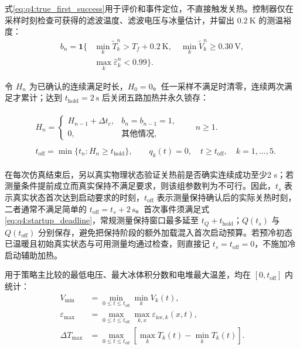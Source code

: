 \documentclass[bwprint]{gmcmthesis}
\numberwithin{equation}{section}
\numberwithin{figure}{section}
\begin{document}
式\eqref{eq:q4:true_first_success}用于评价和事件定位，不直接触发关热。控制器仅在采样时刻检查可获得的滤波温度、滤波电压与冰量估计，并留出 $0.2\ \mathrm K$ 的测温裕度：
\begin{equation}
\begin{aligned}
b_n=\boldsymbol 1\big\{&
\min_k\widetilde T_k^n>T_f+0.2\ \mathrm K,
\quad\min_k\widetilde V_k^n\geq0.30\ \mathrm V,
\\
&\max_k\widehat\varepsilon_k^n<0.99\big\}.
\end{aligned}
\label{eq:q4:sensor_condition}
\end{equation}

令 $H_n$ 为已确认的连续满足时长，$H_0=0$。任一采样不满足时清零，连续两次满足才累计；达到 $t_{\mathrm{hold}}=2\ \mathrm s$ 后关闭五路加热并永久锁存：

\begin{align}
&
\begin{gathered}
H_n=\begin{cases}
H_{n-1}+\Delta t_c, & b_n=b_{n-1}=1,\\
0, & \text{其他情况},
\end{cases}
\qquad n\geq1.
\end{gathered}
\label{eq:q4:hold_counter}\\
&
\begin{gathered}
t_{\mathrm{off}}=\min\{t_n:H_n\geq t_{\mathrm{hold}}\},
\qquad q_k(t)=0,\quad t\geq t_{\mathrm{off}},\quad k=1,\ldots,5.
\end{gathered}
\label{eq:q4:shutdown_latch}
\end{align}

在每次仿真结束后，另以真实物理状态验证关热前是否确实连续成功至少2 s；若测量条件提前成立而真实保持不满足要求，则该组参数判为不可行。因此，$t_s$ 表示真实状态首次达到启动要求的时刻，$t_{\mathrm{off}}$ 表示测量保持确认后的实际关热时刻，二者通常不满足简单的 $t_{\mathrm{off}}=t_s+2\ \mathrm s$。首次事件须满足式\eqref{eq:q4:startup_deadline}，常规测量保持窗口最多延至 $t_Q+t_{\mathrm{hold}}$；$Q(t_s)$ 与 $Q(t_{\mathrm{off}})$ 分别保存，避免把保持阶段的额外加载混入首次启动预算。若预冷初态已温暖且初始真实状态与可用测量均通过检查，则直接记 $t_s=t_{\mathrm{off}}=0$，不施加冷启动辅助加热。

用于策略主比较的最低电压、最大冰体积分数和电堆最大温差，均在 $[0,t_{\mathrm{off}}]$ 内统计：
\begin{equation}
\begin{aligned}
V_{\min}&=\min_{0\leq t\leq t_{\mathrm{off}}}\min_kV_k(t),\\
\varepsilon_{\max}&=\max_{0\leq t\leq t_{\mathrm{off}}}\max_{k,x}\varepsilon_{\mathrm{ice},k}(x,t),\\
\Delta T_{\max}&=\max_{0\leq t\leq t_{\mathrm{off}}}
\left[\max_kT_k(t)-\min_kT_k(t)\right].
\end{aligned}
\label{eq:q4:comparison_metrics}
\end{equation}
\end{document}
